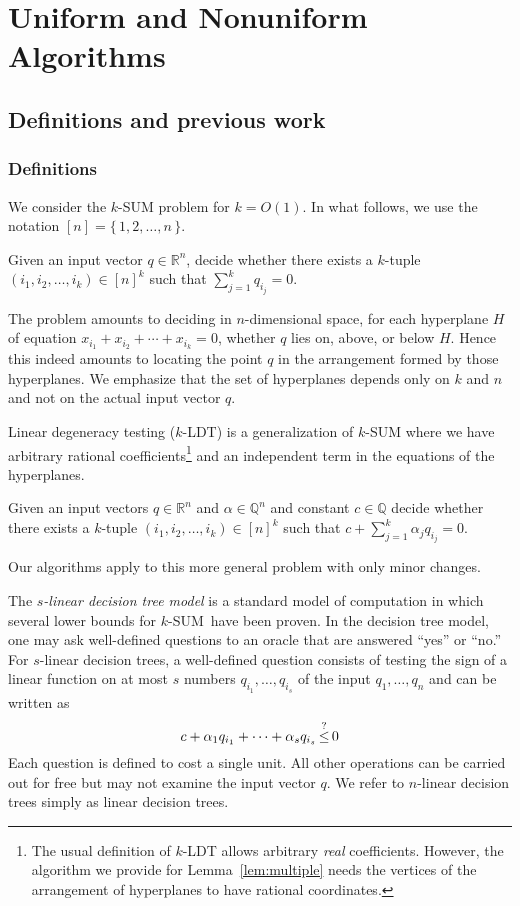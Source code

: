 \chapter{Uniform and Nonuniform Algorithms}

\section{Definitions and previous work}

\subsection{Definitions}
We consider the \(k\)-SUM problem for \(k=O(1)\). In what follows, we use the
notation \([n] = \{\,1,2,\ldots ,n\,\}\).
\begin{problem}[\(k\)-SUM]
 Given an input vector \(q\in\mathbb{R}^n\), decide whether there exists a
 $k$-tuple \((i_1, i_2,\ldots ,i_k) \in {[n]}^k\) such that \(\sum_{j=1}^k
 q_{i_j} = 0\).
\end{problem}
The problem amounts to deciding in $n$-dimensional space, for each hyperplane
\(H\) of equation \(x_{i_1} + x_{i_2} + \cdots +x_{i_k} = 0\), whether \(q\)
lies on, above, or below \(H\). Hence this indeed amounts to locating the point
$q$ in the arrangement formed by those hyperplanes. We emphasize that the set
of hyperplanes depends only on $k$ and $n$ and not on the actual input vector
$q$.

Linear degeneracy testing (\(k\)-LDT) is a generalization of \(k\)-SUM where we
have arbitrary rational coefficients\footnote{The usual definition of \(k\)-LDT
allows arbitrary \emph{real} coefficients. However, the algorithm we provide
for Lemma~\ref{lem:multiple} needs the vertices of the arrangement of
hyperplanes to have rational coordinates.}
and an independent term in the equations
of the hyperplanes.
\begin{problem}[\(k\)-LDT]
 Given an input vectors \(q\in\mathbb{R}^n\) and
 $\alpha \in \mathbb{Q}^n$ and constant $c \in \mathbb{Q}$
 decide whether there exists a
 $k$-tuple \((i_1, i_2,\ldots ,i_k) \in {[n]}^k\) such that
 \(c + \sum_{j=1}^k \alpha_j q_{i_j} = 0\).
 \end{problem}
Our algorithms apply to this more general problem with only minor changes.

The \emph{\(s\)-linear decision tree model} is a standard model of computation
in which several lower bounds for \(k\)-SUM\ have been proven. In the decision tree
model, one may ask well-defined questions to an oracle that are answered
``yes'' or ``no.'' For $s$-linear decision trees, a well-defined question consists
of testing the sign of a linear function on at most \(s\) numbers \(q_{i_1},\ldots,q_{i_s}\) of the
input \(q_1,\ldots,q_n\) and can be written as
$$
	c + \alpha_1 q_{i_1} + \cdots + \alpha_s q_{i_s} \mathop{\le}^{?} 0
$$
Each question is defined to cost a single unit. All other operations can be
carried out for free but may not examine the input vector $q$. We refer to
$n$-linear decision trees simply as linear decision trees.

